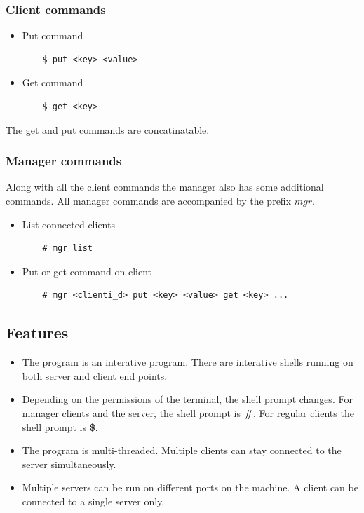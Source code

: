 \documentclass[titlepage]{article}
\begin{document}
    \subsubsection{Client commands}
    \begin{itemize}
    \item Put command
    \begin{verbatim}
    $ put <key> <value>
    \end{verbatim}
    \item Get command
    \begin{verbatim}
    $ get <key>
    \end{verbatim}
    \end{itemize}
    The get and put commands are concatinatable.
    \subsubsection{Manager commands}
    Along with all the client commands the manager also has
    some additional commands.
    All manager commands are accompanied by the prefix $mgr$.
    \begin{itemize}
    \item List connected clients
    \begin{verbatim}
    # mgr list
    \end{verbatim}
    \item Put or get command on client
    \begin{verbatim}
    # mgr <clienti_d> put <key> <value> get <key> ...
    \end{verbatim}
    \end{itemize}
    

    \subsection{Features}
    \begin{itemize}
    \item The program is an interative program. There are interative shells running on both
        server and client end points.
    \item Depending on the permissions of the terminal, the shell prompt changes.
        For manager clients and the server, the shell prompt is \textbf{\#}.
        For regular clients the shell prompt is \textbf{\$}.
    \item The program is multi-threaded. Multiple clients can stay connected to the server
        simultaneously.
    \item Multiple servers can be run on different ports on the machine.
        A client can be connected to a single server only.
    \end{itemize}
\end{document}
